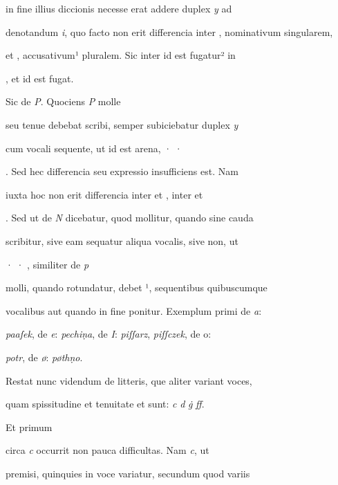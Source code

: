 in fine illius diccionis  necesse erat addere duplex \textit{y} ad

denotandum \textit{i}, quo facto non erit differencia inter , nominativum singularem,

et , accusativum¹ pluralem. Sic inter  id est fugatur² in 

\splitlines
{}, et  id est fugat.

\indentK Sic de \textit{P}. Quociens \textit{P} molle

\fulllines
seu tenue debebat scribi, semper subiciebatur duplex \textit{y}

cum vocali sequente, ut  id est arena, · ·

. Sed hec differencia seu expressio insufficiens est. Nam

iuxta hoc non erit differencia inter  et , inter  et

. Sed ut de \textit{N} dicebatur, quod mollitur, quando sine cauda

scribitur, sive eam sequatur aliqua vocalis, sive non, ut

 · · , similiter de \textit{p}

molli, quando rotundatur, debet ¹, sequentibus quibuscumque

vocalibus aut quando in fine ponitur. Exemplum primi de \textit{a}:

\textit{paaſek}, de \textit{e}: \textit{pechiṇa}, de \textit{I}: \textit{piſſarz}, \textit{piſſczek}, de o\textit{}:

\textit{potr}, de \textit{ø}: \textit{pøthṇo}.

\indentP Restat nunc videndum de litteris, que aliter variant voces,

\splitlines
quam spissitudine et tenuitate et sunt: \textit{c} \textit{d} \textit{ġ} \textit{ﬀ}.

\indentK Et primum

\fulllines

circa \textit{c} occurrit non pauca difficultas. Nam \textit{c}, ut

premisi, quinquies in voce variatur, secundum quod variis

